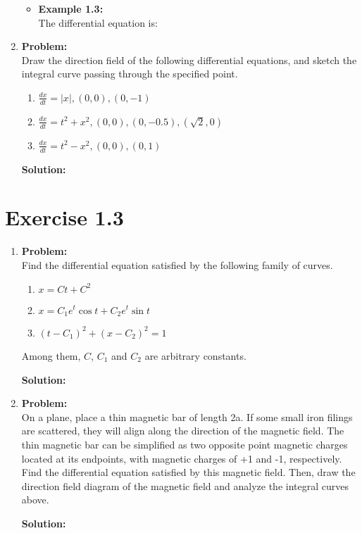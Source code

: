\documentclass[12pt]{article}
\begin{document}
\begin{enumerate}[label=\textbf{Exercise \arabic*:}]
\begin{itemize}
        \item  \textbf{Example 1.3:} \\
        The differential equation is:

    \end{itemize}

    \item
    \textbf{Problem:} \\
    Draw the direction field of the following differential equations, and sketch the integral curve passing through the specified point.
    \begin{enumerate}
        \item $\frac{dx}{dt} = |x| ,(0,0), (0,-1)$
        \item $\frac{dx}{dt} = t^2+x^2, (0,0), (0,-0.5), (\sqrt{2},0)$
        \item $\frac{dx}{dt} = t^2 - x^2, (0,0), (0, 1)$
    \end{enumerate}

    \textbf{Solution:} \\

\end{enumerate}
    \vspace{1em}

    \section{Exercise 1.3}

    \begin{enumerate}[label=\textbf{Exercise \arabic*:}]
        \item
        \textbf{Problem:} \\
        Find the differential equation satisfied by the following family of curves.
        \begin{enumerate}
            \item $x = Ct + C^2$
            \item $x = C_1 e^t \cos t + C_2 e^t \sin t$
            \item $(t-C_1)^2 + (x-C_2)^2 = 1$
        \end{enumerate}

        Among them, $C$, $C_1$ and $C_2$ are arbitrary constants.

        \textbf{Solution:} \\

        \item 
        \textbf{Problem:} \\
        On a plane, place a thin magnetic bar of length 2a. If some small iron filings are scattered, they will align along the direction of the magnetic field. The thin magnetic bar can be simplified as two opposite point magnetic charges located at its endpoints, with magnetic charges of +1 and -1, respectively. Find the differential equation satisfied by this magnetic field. Then, draw the direction field diagram of the magnetic field and analyze the integral curves above.

        \textbf{Solution:} \\

\end{enumerate}
\end{document}
